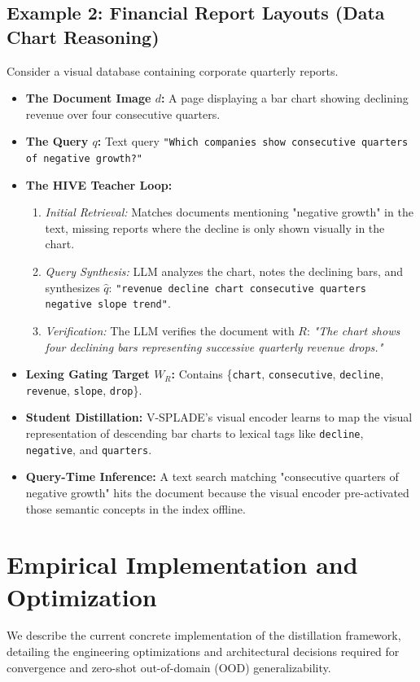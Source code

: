 \documentclass[11pt,a4paper]{article}
\begin{document}
\subsection{Example 2: Financial Report Layouts (Data Chart Reasoning)}
Consider a visual database containing corporate quarterly reports.
\begin{itemize}
    \item \textbf{The Document Image $d$:} A page displaying a bar chart showing declining revenue over four consecutive quarters.
    \item \textbf{The Query $q$:} Text query \texttt{"Which companies show consecutive quarters of negative growth?"}
    \item \textbf{The HIVE Teacher Loop:}
    \begin{enumerate}
        \item \textit{Initial Retrieval:} Matches documents mentioning "negative growth" in the text, missing reports where the decline is only shown visually in the chart.
        \item \textit{Query Synthesis:} LLM analyzes the chart, notes the declining bars, and synthesizes $\hat{q}$: \texttt{"revenue decline chart consecutive quarters negative slope trend"}.
        \item \textit{Verification:} The LLM verifies the document with $R$: \textit{"The chart shows four declining bars representing successive quarterly revenue drops."}
    \end{enumerate}
    \item \textbf{Lexing Gating Target $W_R$:} Contains \{\texttt{chart}, \texttt{consecutive}, \texttt{decline}, \texttt{revenue}, \texttt{slope}, \texttt{drop}\}.
    \item \textbf{Student Distillation:} V-SPLADE's visual encoder learns to map the visual representation of descending bar charts to lexical tags like \texttt{decline}, \texttt{negative}, and \texttt{quarters}.
    \item \textbf{Query-Time Inference:} A text search matching "consecutive quarters of negative growth" hits the document because the visual encoder pre-activated those semantic concepts in the index offline.
\end{itemize}

\section{Empirical Implementation and Optimization}
We describe the current concrete implementation of the distillation framework, detailing the engineering optimizations and architectural decisions required for convergence and zero-shot out-of-domain (OOD) generalizability.
\end{document}
